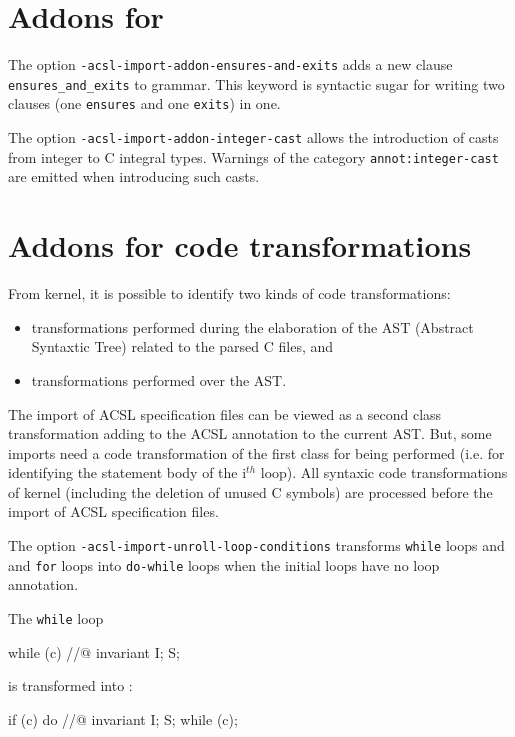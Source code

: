 \documentclass{frama-c-book}
\begin{document}
\section*{Addons for \acsl}
\markright{}
The option \verb|-acsl-import-addon-ensures-and-exits| adds a new clause \verb|ensures_and_exits| to \acsl grammar. This keyword is syntactic sugar for writing two clauses (one \verb|ensures| and one \verb|exits|) in one.

The option \verb|-acsl-import-addon-integer-cast| allows the introduction of casts from integer to C integral types. Warnings of the category \verb|annot:integer-cast| are emitted when introducing such casts.


\section*{Addons for code transformations}
\markright{}
From \FramaC kernel, it is possible to identify two kinds of code transformations:
\begin{itemize}
\item transformations performed during the elaboration of the AST (Abstract Syntaxtic Tree) related to the parsed C files, and
\item transformations performed over the AST.
\end{itemize}

The import of ACSL specification files can be viewed as a second class transformation adding to the ACSL annotation to the current AST.
But, some imports need a code transformation of the first class for being performed (i.e. for identifying the statement body of the i$^{th}$ loop).
All syntaxic code transformations of \FramaC kernel (including the deletion of unused C symbols) are processed before the import of ACSL specification files.

The option \verb|-acsl-import-unroll-loop-conditions| transforms \verb|while| loops and and \verb|for| loops into \verb|do-while| loops when the initial loops have no loop annotation.

The \verb|while| loop
\begin{shell}
  while (c)
    //@ invariant I;
    S;
\end{shell}
is transformed into :
\begin{shell}
  if (c)
    do //@ invariant I;
      S;
    while (c);
\end{shell}
\end{document}
